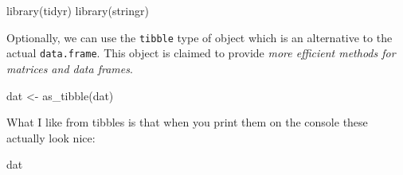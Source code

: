 \documentclass[
]{book}
\newenvironment{Shaded}{\begin{snugshade}}{\end{snugshade}}
\newcommand{\FunctionTok}[1]{\textcolor[rgb]{0.00,0.00,0.00}{#1}}
\newcommand{\NormalTok}[1]{#1}
\newcommand{\OtherTok}[1]{\textcolor[rgb]{0.56,0.35,0.01}{#1}}
\begin{document}
\begin{Shaded}
\begin{Highlighting}[]
\FunctionTok{library}\NormalTok{(tidyr)}
\FunctionTok{library}\NormalTok{(stringr)}
\end{Highlighting}
\end{Shaded}

Optionally, we can use the \texttt{tibble} type of object which is an alternative to the actual \texttt{data.frame}. This object is claimed to provide \emph{more efficient methods for matrices and data frames}.

\begin{Shaded}
\begin{Highlighting}[]
\NormalTok{dat }\OtherTok{\textless{}{-}} \FunctionTok{as\_tibble}\NormalTok{(dat)}
\end{Highlighting}
\end{Shaded}

What I like from tibbles is that when you print them on the console these actually look nice:

\begin{Shaded}
\begin{Highlighting}[]
\NormalTok{dat}
\end{Highlighting}
\end{Shaded}
\end{document}

